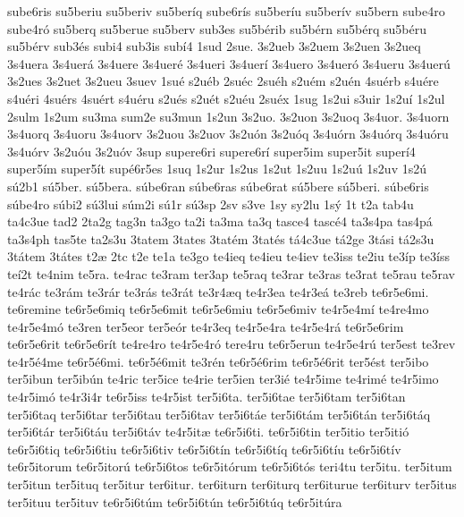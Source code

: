 {sube6ris
su5beriu
su5beriv
su5ber^^edq
sube6r^^eds
su5ber^^edu
su5ber^^edv
su5bern
sube4ro
sube4r^^f3
su5berq
su5berue
su5berv
sub3es
su5b^^e9rib
su5b^^e9rn
su5b^^e9rq
su5b^^e9ru
su5b^^e9rv
sub3^^e9s
subi4
sub3is
sub^^ed4
1sud
2sue.
3s2ueb
3s2uem
3s2uen
3s2ueq
3s4uera
3s4uer^^e1
3s4uere
3s4uer^^e9
3s4ueri
3s4uer^^ed
3s4uero
3s4uer^^f3
3s4ueru
3s4uer^^fa
3s2ues
3s2uet
3s2ueu
3suev
1su^^e9
s2u^^e9b
2su^^e9c
2su^^e9h
s2u^^e9m
s2u^^e9n
4su^^e9rb
s4u^^e9re
s4u^^e9ri
4su^^e9rs
4su^^e9rt
s4u^^e9ru
s2u^^e9s
s2u^^e9t
s2u^^e9u
2su^^e9x
1sug
1s2ui
s3uir
1s2u^^ed
1s2ul
2sulm
1s2um
su3ma
sum2e
su3mun
1s2un
3s2uo.
3s2uon
3s2uoq
3s4uor.
3s4uorn
3s4uorq
3s4uoru
3s4uorv
3s2uou
3s2uov
3s2u^^f3n
3s2u^^f3q
3s4u^^f3rn
3s4u^^f3rq
3s4u^^f3ru
3s4u^^f3rv
3s2u^^f3u
3s2u^^f3v
3sup
supere6ri
supere6r^^ed
super5im
super5it
super^^ed4
super5^^edm
super5^^edt
sup^^e96r5es
1suq
1s2ur
1s2us
1s2ut
1s2uu
1s2u^^fa
1s2uv
1s2^^fa
s^^fa2b1
s^^fa5ber.
s^^fa5bera.
s^^fabe6ran
s^^fabe6ras
s^^fabe6rat
s^^fa5bere
s^^fa5beri.
s^^fabe6ris
s^^fabe4ro
s^^fabi2
s^^fa3lui
s^^fam2i
s^^fa1r
s^^fa3sp
2sv
s3ve
1sy
sy2lu
1s^^fd
1t
t2a
tab4u
ta4c3ue
tad2
2ta2g
tag3n
ta3go
ta2i
ta3ma
ta3q
tasce4
tasc^^e94
ta3s4pa
tas4p^^e1
ta3s4ph
tas5te
ta2s3u
3tatem
3tates
3tat^^e9m
3tat^^e9s
t^^e14c3ue
t^^e12ge
3t^^e1si
t^^e12s3u
3t^^e1tem
3t^^e1tes
t2^^e6
2tc
t2e
te1a
te3go
te4ieq
te4ieu
te4iev
te3iss
te2iu
te3^^edp
te3^^edss
te^^ed2t
te4nim
te5ra.
te4rac
te3ram
ter3ap
te5raq
te3rar
te3ras
te3rat
te5rau
te5rav
te4r^^e1c
te3r^^e1m
te3r^^e1r
te3r^^e1s
te3r^^e1t
te3r4^^e6q
te4r3ea
te4r3e^^e1
te3reb
te6r5e6mi.
te6remine
te6r5e6miq
te6r5e6mit
te6r5e6miu
te6r5e6miv
te4r5e4m^^ed
te4re4mo
te4r5e4m^^f3
te3ren
ter5eor
ter5e^^f3r
te4r3eq
te4r5e4ra
te4r5e4r^^e1
te6r5e6rim
te6r5e6rit
te6r5e6r^^edt
te4re4ro
te4r5e4r^^f3
tere4ru
te6r5erun
te4r5e4r^^fa
ter5est
te3rev
te4r5^^e94me
te6r5^^e96mi.
te6r5^^e96mit
te3r^^e9n
te6r5^^e96rim
te6r5^^e96rit
ter5^^e9st
ter5ibo
ter5ibun
ter5ib^^fan
te4ric
ter5ice
te4rie
ter5ien
ter3i^^e9
te4r5ime
te4rim^^e9
te4r5imo
te4r5im^^f3
te4r3i4r
te6r5iss
te4r5ist
ter5i6ta.
ter5i6tae
ter5i6tam
ter5i6tan
ter5i6taq
ter5i6tar
ter5i6tau
ter5i6tav
ter5i6t^^e1e
ter5i6t^^e1m
ter5i6t^^e1n
ter5i6t^^e1q
ter5i6t^^e1r
ter5i6t^^e1u
ter5i6t^^e1v
te4r5it^^e6
te6r5i6ti.
te6r5i6tin
ter5itio
ter5iti^^f3
te6r5i6tiq
te6r5i6tiu
te6r5i6tiv
te6r5i6t^^edn
te6r5i6t^^edq
te6r5i6t^^edu
te6r5i6t^^edv
te6r5itorum
te6r5itor^^fa
te6r5i6tos
te6r5it^^f3rum
te6r5i6t^^f3s
teri4tu
ter5itu.
ter5itum
ter5itun
ter5ituq
ter5itur
ter6itur.
ter6iturn
ter6iturq
ter6iturue
ter6iturv
ter5itus
ter5ituu
ter5ituv
te6r5i6t^^fam
te6r5i6t^^fan
te6r5i6t^^faq
te6r5it^^fara
}
